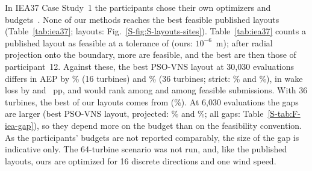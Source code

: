 In IEA37 Case Study~1 the participants chose their own optimizers and budgets~\cite{Baker2019}. None of our methods reaches the best feasible published layouts (Table~\ref{tab:iea37}; layouts: Fig.~\ref{S-fig:S-layouts-sites}). Table~\ref{tab:iea37} counts a published layout as feasible at a tolerance of \NFIEATolStrict{} (ours: $10^{-6}$~m); after radial projection onto the boundary, \NFIEANChanged{} more are feasible, and the best are then those of participant~12. Against these, the best PSO-VNS layout at 30,030 evaluations differs in AEP by \NFIEAGapSixteenThirtyKProj\% (16 turbines) and \NFIEAGapThirtySixThirtyKProj\% (36 turbines; strict: \NFIEAGapSixteenThirtyKStrict\% and \NFIEAGapThirtySixThirtyKStrict\%), in wake loss by \NFIEAGapLossSixteenThirtyKProj{} and \NFIEAGapLossThirtySixThirtyKProj~pp, and would rank \NFIEARankSixteenThirtyKProj{} among \NFIEAPubFeasProjSixteen{} and \NFIEARankThirtySixThirtyKProj{} among \NFIEAPubFeasProjThirtySix{} feasible submissions. With 36 turbines, the best of our layouts comes from \NFIEAOurBestByThirtySixThirtyK{} (\NFIEAOurBestGapThirtySixThirtyKProj\%). At 6,030 evaluations the gaps are larger (best PSO-VNS layout, projected: \NFIEAGapSixteenSixKProj\% and \NFIEAGapThirtySixSixKProj\%; all gaps: Table~\ref{S-tab:F-iea-gap}), so they depend more on the budget than on the feasibility convention. As the participants' budgets are not reported comparably, the size of the gap is indicative only. The 64-turbine scenario was not run, and, like the published layouts, ours are optimized for 16 discrete directions and one wind speed.

